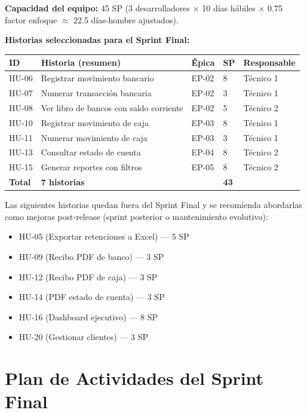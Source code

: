 \documentclass[stu]{apa7}
\begin{document}
\textbf{Capacidad del equipo:} 45 SP (3 desarrolladores $\times$ 10 días hábiles $\times$ 0.75 factor enfoque $\approx$ 22.5 días-hombre ajustados).

\textbf{Historias seleccionadas para el Sprint Final:}

\begin{longtable}{|C{0.8cm}|L{4.5cm}|C{2cm}|C{1.5cm}|C{1.5cm}|}
\hline
{}
\textbf{ID} & \textbf{Historia (resumen)} & \textbf{Épica} & \textbf{SP} & \textbf{Responsable} \\
\hline
HU-06 & Registrar movimiento bancario & EP-02 & 8 & Técnico 1 \\
\hline
HU-07 & Numerar transacción bancaria & EP-02 & 3 & Técnico 1 \\
\hline
HU-08 & Ver libro de bancos con saldo corriente & EP-02 & 5 & Técnico 2 \\
\hline
HU-10 & Registrar movimiento de caja & EP-03 & 8 & Técnico 1 \\
\hline
HU-11 & Numerar movimiento de caja & EP-03 & 3 & Técnico 1 \\
\hline
HU-13 & Consultar estado de cuenta & EP-04 & 8 & Técnico 2 \\
\hline
HU-15 & Generar reportes con filtros & EP-05 & 8 & Técnico 2 \\
\hline
{}
\textbf{Total} & \textbf{7 historias} & & \textbf{43} & \\
\hline
\end{longtable}

Las siguientes historias quedan fuera del Sprint Final y se recomienda abordarlas como mejoras post-release (sprint posterior o mantenimiento evolutivo):

\begin{itemize}
    \item HU-05 (Exportar retenciones a Excel) --- 5 SP
    \item HU-09 (Recibo PDF de banco) --- 3 SP
    \item HU-12 (Recibo PDF de caja) --- 3 SP
    \item HU-14 (PDF estado de cuenta) --- 3 SP
    \item HU-16 (Dashboard ejecutivo) --- 8 SP
    \item HU-20 (Gestionar clientes) --- 3 SP
\end{itemize}

\section{Plan de Actividades del Sprint Final}
\end{document}
